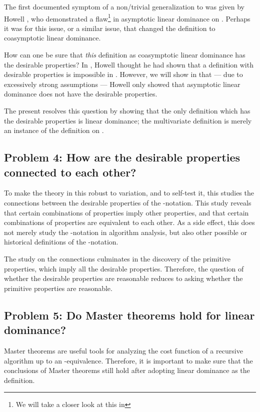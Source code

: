 \documentclass[b5paper, english, oneside]{memoir}
\begin{document}
The first documented symptom of a non\-/trivial generalization to  was given by Howell \cite{OhImpossible}, who demonstrated a flaw\footnote{We will take a closer look at this in } in asymptotic linear dominance on . Perhaps it was for this issue, or a similar issue, that \cite{IntroAlgo2009} changed the definition to coasymptotic linear dominance. 

How can one be sure that \emph{this} definition as coasymptotic linear dominance has the desirable properties? In \cite{OhImpossible}, Howell thought he had shown that a definition with desirable properties is impossible in . However, we will show in  that --- due to excessively strong assumptions --- Howell only showed that asymptotic linear dominance does not have the desirable properties. 

The present \manuscript{} resolves this question by showing that the only definition which has the desirable properties is linear dominance; the multivariate definition is merely an instance of the definition on . 

\subsection{Problem 4: How are the desirable properties connected to each other?}

To make the theory in this \manuscript{} robust to variation, and to self-test it, this \manuscript{} studies the connections between the desirable properties of the -notation. This study reveals that certain combinations of properties imply other properties, and that certain combinations of properties are equivalent to each other. As a side effect, this \manuscript{} does not merely study the -notation in algorithm analysis, but also other possible or historical definitions of the -notation. 

The study on the connections culminates in the discovery of the \nprim{} primitive properties, which imply all the desirable properties. Therefore, the question of whether the desirable properties are reasonable reduces to asking whether the primitive properties are reasonable.

\subsection{Problem 5: Do Master theorems hold for linear dominance?}

Master theorems are useful tools for analyzing the cost function of a recursive algorithm up to an -equivalence. Therefore, it is important to make sure that the conclusions of Master theorems still hold after adopting linear dominance as the definition. 
\end{document}
